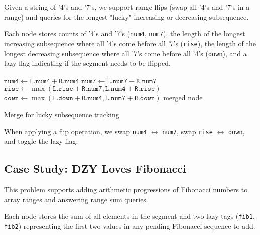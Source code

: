 
Given a string of '4's and '7's, we support range flips (swap all '4's and '7's in a range) and queries for the longest "lucky" increasing or decreasing subsequence.

Each node stores counts of '4's and '7's (\texttt{num4}, \texttt{num7}), the length of the longest increasing subsequence where all '4's come before all '7's (\texttt{rise}), the length of the longest decreasing subsequence where all '7's come before all '4's (\texttt{down}), and a lazy flag indicating if the segment needs to be flipped.

\begin{algorithm}[H]
\SetAlgoLined
{}
\BlankLine
$\texttt{num4} \gets \texttt{L.num4} + \texttt{R.num4}$\;
$\texttt{num7} \gets \texttt{L.num7} + \texttt{R.num7}$\;
$\texttt{rise} \gets \max(\texttt{L.rise} + \texttt{R.num7}, \texttt{L.num4} + \texttt{R.rise})$\;
$\texttt{down} \gets \max(\texttt{L.down} + \texttt{R.num4}, \texttt{L.num7} + \texttt{R.down})$\;
\Return merged node\;
\caption{Merge for lucky subsequence tracking}
\end{algorithm}

When applying a flip operation, we swap \texttt{num4} $\leftrightarrow$ \texttt{num7}, swap \texttt{rise} $\leftrightarrow$ \texttt{down}, and toggle the lazy flag.

\subsection{Case Study: DZY Loves Fibonacci}


This problem supports adding arithmetic progressions of Fibonacci numbers to array ranges and answering range sum queries.

Each node stores the sum of all elements in the segment and two lazy tags (\texttt{fib1}, \texttt{fib2}) representing the first two values in any pending Fibonacci sequence to add.

